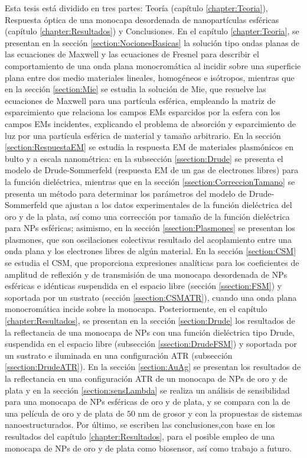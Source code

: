 Esta tesis está dividido en tres partes: Teoría (capítulo \ref{chapter:Teoria}), Respuesta óptica de una monocapa desordenada de nanopartículas esféricas (capítulo \ref{chapter:Resultados}) y Conclusiones. En el capítulo \ref{chapter:Teoria}, se presentan en la sección \ref{section:NocionesBasicas} la solución tipo ondas planas de las ecuaciones de Maxwell y las ecuaciones de Fresnel para describir el comportamiento de una onda plana monocromática al incidir sobre una superficie plana entre dos medio materiales lineales, homogéneos e isótropos, mientras que en la sección \ref{section:Mie} se estudia la solución de Mie, que resuelve las ecuaciones de Maxwell para una partícula esférica, empleando la matriz de esparcimiento que relaciona los campos EMs esparcidos por la esfera con los campos EMs incidentes, explicando el problema de absorción y esparcimiento de luz por una partícula esférica de material y tamaño arbitrario. En la sección \ref{section:RespuestaEM} se estudia la respuesta EM de materiales plasmónicos en bulto y a escala nanométrica: en la subsección \ref{ssection:Drude} se presenta el modelo de Drude-Sommerfeld (respuesta EM de un gas de electrones libres) para la función dieléctrica, mientras que en la sección \ref{ssection:CorreccionTamano} se presenta un método para determinar los parámetros del modelo de Drude-Sommerfeld que ajustan a los datos experimentales de la función dieléctrica del oro y de la plata, así como una corrección por tamaño de la función dieléctrica para NPs esféricas; asimismo, en la sección \ref{ssection:Plasmones} se presentan los plasmones, que son oscilaciones colectivas resultado del acoplamiento entre una onda plana y los electrones libres de algún material. En la  sección \ref{section:CSM} se estudia el CSM, que proporciona expresiones analíticas para los  coeficientes de amplitud de reflexión y de transmisión de una monocapa desordenada de NPs esféricas e idénticas suspendida en el espacio libre (sección \ref{ssection:FSM}) y  soportada por un sustrato (sección \ref{ssection:CSMATR}), cuando una onda plana monocromática incide sobre la monocapa. Posteriormente, en el capítulo \ref{chapter:Resultados}, se presentan en la sección \ref{section:Drude} los resultados de la reflectancia de una monocapa de NPs con una función dieléctrica tipo Drude, suspendida en el espacio libre (subsección \ref{ssection:DrudeFSM}) y soportada por un sustrato e iluminada en una configuración ATR (subsección \ref{ssection:DrudeATR}). En la sección \ref{section:AuAg} se presentan los resultados de la reflectancia en una configuración ATR de un monocapa de NPs de oro y de plata y en la sección \ref{section:sensLambda} se realiza un análisis de sensibilidad para una monocapa de NPs esféricas de oro y de plata,  y se compara con la de una película de oro y de plata de $50$ nm de grosor y con la propuestas de sistemas nanoestructurados. Por último, se escriben las conclusiones,con base en los resultados del capítulo \ref{chapter:Resultados}, para el posible empleo de una monocapa de NPs de oro y de plata como biosensor, así como trabajo a futuro.
